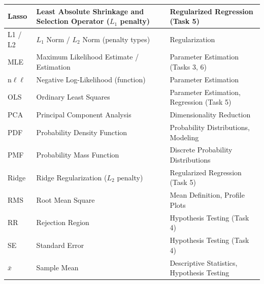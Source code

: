 \begin{tabular}{ | m{2.1cm} | m{7cm}| m{7cm} | }
Lasso & Least Absolute Shrinkage and Selection Operator ($L_1$ penalty) & Regularized Regression (Task 5) \\ \hline
L1 / L2 & $L_1$ Norm / $L_2$ Norm (penalty types) & Regularization \\ \hline
MLE & Maximum Likelihood Estimate / Estimation & Parameter Estimation (Tasks 3, 6) \\ \hline
n$\ell\ell$ & Negative Log-Likelihood (function) & Parameter Estimation \\ \hline
OLS & Ordinary Least Squares & Parameter Estimation, Regression (Task 5) \\ \hline
PCA & Principal Component Analysis & Dimensionality Reduction \\ \hline
PDF & Probability Density Function & Probability Distributions, Modeling \\ \hline
PMF & Probability Mass Function & Discrete Probability Distributions \\ \hline
Ridge & Ridge Regularization ($L_2$ penalty) & Regularized Regression (Task 5) \\ \hline
RMS & Root Mean Square & Mean Definition, Profile Plots \\ \hline
RR & Rejection Region & Hypothesis Testing (Task 4) \\ \hline
SE & Standard Error & Hypothesis Testing (Task 4) \\ \hline
$\bar{x}$ & Sample Mean & Descriptive Statistics, Hypothesis Testing \\ \hline
\end{tabular}
